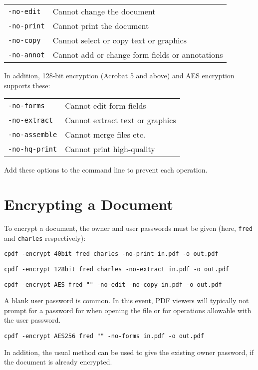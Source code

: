 \documentclass{book}
\begin{document}
   \vspace{2mm}
   \begin{tabular}{ll}
     \texttt{-no-edit} & Cannot change the document\\
     \texttt{-no-print} & Cannot print the document\\
     \texttt{-no-copy} & Cannot select or copy text or graphics\\
     \texttt{-no-annot} & Cannot add or change form fields or annotations\\
   \end{tabular}

   \vspace{2mm}
   \noindent In addition, 128-bit encryption (Acrobat 5 and above) and AES encryption supports these:

   \vspace{2mm}
   \begin{tabular}{ll}
     \texttt{-no-forms} & Cannot edit form fields\\
     \texttt{-no-extract} & Cannot extract text or graphics\\
     \texttt{-no-assemble} & Cannot merge files etc.\\
     \texttt{-no-hq-print} & Cannot print high-quality\\
   \end{tabular}

  \vspace{2mm}
  \noindent Add these options to the command line to prevent each operation.

  \vspace{2mm}

  \section{Encrypting a Document}
  To encrypt a document, the owner and user passwords must be given (here, \texttt{fred} and \texttt{charles} respectively):
  \begin{framed}
    \small\verb!cpdf -encrypt 40bit fred charles -no-print in.pdf -o out.pdf!

    \vspace{1.5mm}
    \small\verb!cpdf -encrypt 128bit fred charles -no-extract in.pdf -o out.pdf!

    \vspace{1.5mm}
    \small\verb!cpdf -encrypt AES fred "" -no-edit -no-copy in.pdf -o out.pdf!
  \end{framed}
  \noindent A blank user password is
common. In this event, PDF viewers will typically not prompt for a
password for when opening the file or for operations allowable with the user password.
  \begin{framed}
    \vspace{1.5mm}
    \small\verb!cpdf -encrypt AES256 fred "" -no-forms in.pdf -o out.pdf!
  \end{framed}
\noindent In addition, the usual method can be used to give the existing owner
password, if the document is already encrypted.
\end{document}
